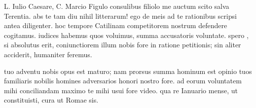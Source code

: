 


 L. Iulio Caesare, C. Marcio Figulo consulibus filiolo me auctum scito salva Terentia. abs te tam diu nihil litterarum! ego de meis ad te rationibus scripsi antea diligenter. hoc tempore Catilinam competitorem nostrum defendere cogitamus. iudices habemus quos voluimus, summa accusatoris voluntate. spero , si absolutus erit, coniunctiorem illum nobis fore in ratione petitionis; sin aliter acciderit, humaniter feremus.

 tuo adventu nobis opus est maturo; nam prorsus summa hominum est opinio tuos familiaris nobilis homines adversarios honori nostro fore. ad eorum voluntatem mihi conciliandam maximo te mihi usui fore video. qua re Ianuario mense, ut constituisti, cura ut Romae sis.

